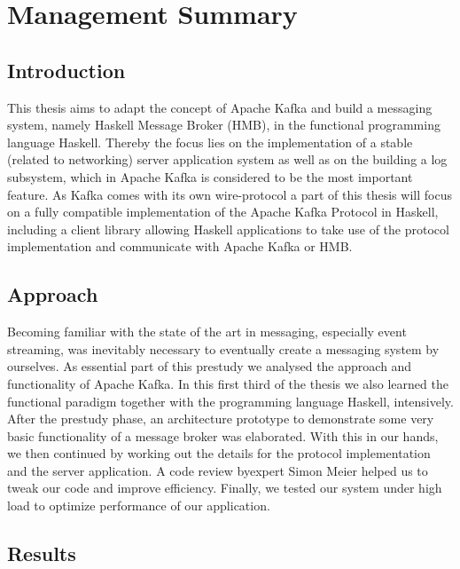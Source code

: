 \chapter{Management Summary}

\section{Introduction}

This thesis aims to adapt the concept of Apache Kafka and build a messaging
system, namely Haskell Message Broker (HMB), in the functional programming
language Haskell. Thereby the focus lies on the implementation of a stable
(related to networking) server application system as well as on the building a
log subsystem, which in Apache Kafka is considered to be the most important
feature. As Kafka comes with its own wire-protocol a part of this thesis will
focus on a fully compatible implementation of the Apache Kafka Protocol in
Haskell, including a client library allowing Haskell applications to take use of
the protocol implementation and communicate with Apache Kafka or HMB.

\section{Approach}

Becoming familiar with the state of the art in messaging, especially event
streaming, was inevitably necessary to eventually create a messaging system by
ourselves. As essential part of this prestudy we analysed the approach and
functionality of Apache Kafka. In this first third of the thesis we also learned
the functional paradigm together with the programming language Haskell,
intensively. After the prestudy phase, an architecture prototype to demonstrate
some very basic functionality of a message broker was elaborated. With this in
our hands, we then continued by working out the details for the protocol
implementation and the server application. A code review byexpert Simon Meier
helped us to tweak our code and improve efficiency. Finally, we tested our
system under high load to optimize performance of our application.

\section{Results}

